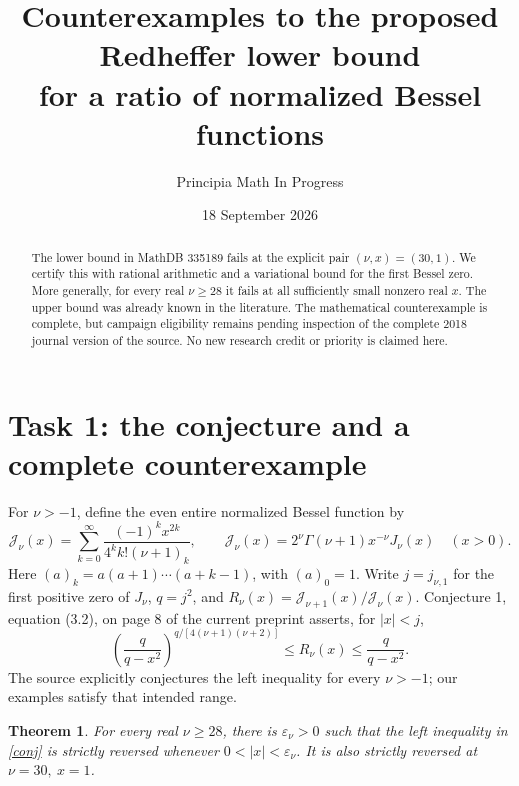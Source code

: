 \documentclass[11pt]{article}
\title{Counterexamples to the proposed Redheffer lower bound\\
for a ratio of normalized Bessel functions}
\author{Principia Math In Progress}
\date{18 September 2026}
\newtheorem{theorem}{Theorem}
\newcommand{\J}{\mathcal J}
\begin{document}
\maketitle
\begin{abstract}
The lower bound in MathDB 335189 fails at the explicit pair
\((\nu,x)=(30,1)\). We certify this with rational arithmetic and
a variational bound for the first Bessel zero. More generally, for
every real \(\nu\ge28\) it fails at all sufficiently small nonzero
real \(x\). The upper bound was already known in the literature.
The mathematical counterexample is complete, but campaign eligibility
remains pending inspection of the complete 2018 journal version of
the source. No new research credit or priority is claimed here.
\end{abstract}

\section*{Task 1: the conjecture and a complete counterexample}
For \(\nu>-1\), define the even entire normalized Bessel function by
\[
 \J_\nu(x)=\sum_{k=0}^{\infty}
 \frac{(-1)^k x^{2k}}{4^k k!(\nu+1)_k},
 \qquad
 \J_\nu(x)=2^\nu\Gamma(\nu+1)x^{-\nu}J_\nu(x)\quad(x>0).
\]
Here \((a)_k=a(a+1)\cdots(a+k-1)\), with \((a)_0=1\).
Write \(j=j_{\nu,1}\) for the first positive zero of \(J_\nu\),
\(q=j^2\), and \(R_\nu(x)=\J_{\nu+1}(x)/\J_\nu(x)\).
Conjecture 1, equation (3.2), on page 8 of the current preprint
\cite{BM} asserts, for \(|x|<j\),
\begin{equation}\label{conj}
 \left(\frac q{q-x^2}\right)^{q/[4(\nu+1)(\nu+2)]}
 \le R_\nu(x)\le\frac q{q-x^2}.
\end{equation}
The source explicitly conjectures the left inequality for every
\(\nu>-1\); our examples satisfy that intended range.

\begin{theorem}\label{main}
For every real \(\nu\ge28\), there is \(\varepsilon_\nu>0\)
such that the left inequality in \eqref{conj} is strictly reversed
whenever \(0<|x|<\varepsilon_\nu\).
It is also strictly reversed at \(\nu=30,\ x=1\).
\end{theorem}
\end{document}
